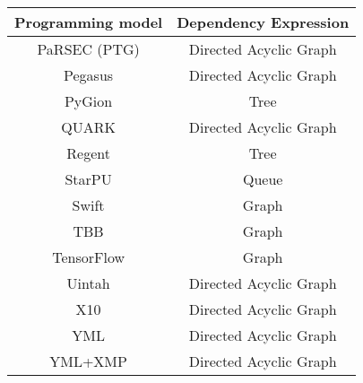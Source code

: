 \begin{tabular}{cc}
\hline
Programming model & Dependency Expression \\
\hline
PaRSEC (PTG) & Directed Acyclic Graph\\
Pegasus & Directed Acyclic Graph\\
PyGion & Tree\\
QUARK & Directed Acyclic Graph\\
Regent & Tree\\
StarPU & Queue\\
Swift & Graph\\
TBB & Graph\\
TensorFlow & Graph\\
Uintah & Directed Acyclic Graph\\
X10 & Directed Acyclic Graph\\
YML & Directed Acyclic Graph\\
YML+XMP & Directed Acyclic Graph\\
\hline
\end{tabular}
